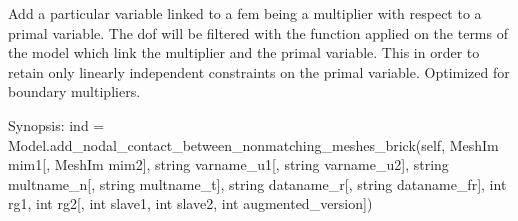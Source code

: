 \documentclass[a4paper,11pt,english]{sphinxmanual}
\begin{document}
\begin{fulllineitems}
\begin{fulllineitems}
\end{fulllineitems}


\begin{fulllineitems}
\label{\detokenize{python/cmdref_Model:getfem.Model.add_multiplier}}
Add a particular variable linked to a fem being a multiplier with
respect to a primal variable. The dof will be filtered with the
 function applied on the terms of the model
which link the multiplier and the primal variable. This in order to
retain only linearly independent constraints on the primal variable.
Optimized for boundary multipliers.

\end{fulllineitems}


\begin{fulllineitems}
\label{\detokenize{python/cmdref_Model:getfem.Model.add_nodal_contact_between_nonmatching_meshes_brick}}
Synopsis: ind = Model.add\_nodal\_contact\_between\_nonmatching\_meshes\_brick(self,  MeshIm mim1{[}, MeshIm mim2{]}, string varname\_u1{[}, string varname\_u2{]}, string multname\_n{[}, string multname\_t{]}, string dataname\_r{[}, string dataname\_fr{]}, int rg1, int rg2{[}, int slave1, int slave2,  int augmented\_version{]})


\end{fulllineitems}
\end{fulllineitems}
\end{document}
